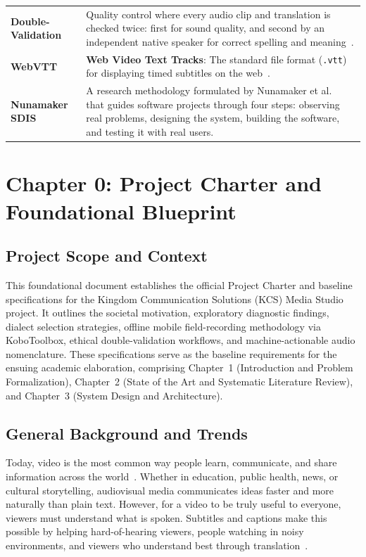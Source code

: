 \documentclass[a4paper,11pt]{article}
\begin{document}
\begin{table}[h!]
\begin{tabular}{p{3.0cm} p{14.5cm}}
\addlinespace
\textbf{Double-Validation} & Quality control where every audio clip and translation is checked twice: first for sound quality, and second by an independent native speaker for correct spelling and meaning~\cite{bird2014coscab}. \\
\addlinespace
\textbf{WebVTT} & \textbf{Web Video Text Tracks}: The standard file format (\texttt{.vtt}) for displaying timed subtitles on the web~\cite{w3c2019webvtt}. \\
\addlinespace
\textbf{Nunamaker SDIS} & A research methodology formulated by Nunamaker et al.~\cite{nunamaker1990systems} that guides software projects through four steps: observing real problems, designing the system, building the software, and testing it with real users. \\
\bottomrule
\end{tabular}
\end{table}

\mainmatter

\section{Chapter 0: Project Charter and Foundational Blueprint}
\label{sec:chap0_charter}

\subsection{Project Scope and Context}
\label{sec:chap0_scope}

This foundational document establishes the official Project Charter and baseline specifications for the Kingdom Communication Solutions (KCS) Media Studio project. It outlines the societal motivation, exploratory diagnostic findings, dialect selection strategies, offline mobile field-recording methodology via KoboToolbox, ethical double-validation workflows, and machine-actionable audio nomenclature. These specifications serve as the baseline requirements for the ensuing academic elaboration, comprising Chapter~1 (Introduction and Problem Formalization), Chapter~2 (State of the Art and Systematic Literature Review), and Chapter~3 (System Design and Architecture).

\subsection{General Background and Trends}
\label{sec:intro:background}

Today, video is the most common way people learn, communicate, and share information across the world~\cite{mayer2020multimedia}. Whether in education, public health, news, or cultural storytelling, audiovisual media communicates ideas faster and more naturally than plain text. However, for a video to be truly useful to everyone, viewers must understand what is spoken. Subtitles and captions make this possible by helping hard-of-hearing viewers, people watching in noisy environments, and viewers who understand best through translation~\cite{vaswani2017attention, radford2023robust}.
\end{document}
